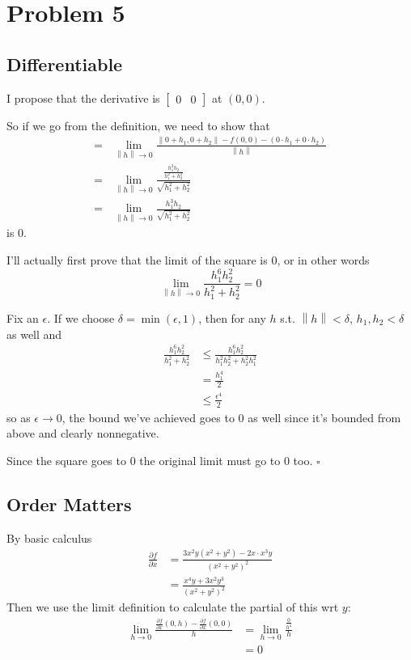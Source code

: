 \documentclass[12pt]{article}
\newcommand{\norm}[1]{\left\lVert#1\right\rVert}
\begin{document}
\pagebreak

\section{Problem 5}

\subsection{Differentiable}

I propose that the derivative is $\begin{bmatrix}0 & 0\end{bmatrix}$ at $(0, 0)$.

So if we go from the definition, we need to show that
\begin{align*}
  ={} & \lim_{\norm{h} \to 0} \frac{\norm{0 + h_1, 0 + h_2}-f(0, 0) - (0 \cdot h_1 + 0 \cdot h_2)}{\norm{h}} \\
  ={} & \lim_{\norm{h} \to 0} \frac{\frac{h_1^3h_2}{h_1^2+h_2^2}}{\sqrt{h_1^2+h_2^2}}                        \\
  ={} & \lim_{\norm{h} \to 0} \frac{h_1^3h_2}{\sqrt{h_1^2+h_2^2}}
\end{align*}
is $0$.

I'll actually first prove that the limit of the square is $0$, or in other words
\[\lim_{\norm{h} \to 0} \frac{h_1^6h_2^2}{h_1^2+h_2^2}=0\]

Fix an $\epsilon$.
If we choose $\delta=\min(\epsilon, 1)$, then for any $h$ s.t. $\norm{h} < \delta$,
$h_1, h_2 < \delta$ as well and
\begin{align*}
  \frac{h_1^6h_2^2}{h_1^2+h_2^2}
   & \le \frac{h_1^6h_2^2}{h_1^2h_2^2+h_2^2h_1^2} \\
   & = \frac{h_1^4}{2}                            \\
   & \le \frac{\epsilon^4}{2}
\end{align*}
so as $\epsilon \to 0$, the bound we've achieved goes to $0$ as well
since it's bounded from above and clearly nonnegative.

Since the square goes to $0$ the original limit must go to $0$ too. $\square$

\pagebreak

\subsection{Order Matters}

By basic calculus
\begin{align*}
  \frac{\partial f}{\partial x}
   & = \frac{3x^2y\left(x^2+y^2\right)-2x \cdot x^3y}{\left(x^2+y^2\right)^2} \\
   & = \frac{x^4y+3x^2y^3}{\left(x^2+y^2\right)^2}
\end{align*}
Then we use the limit definition to calculate the partial of this wrt $y$:
\begin{align*}
  \lim_{h \to 0} \frac{\frac{\partial f}{\partial x}(0, h)-\frac{\partial f}{\partial x}(0, 0)}{h}
   & = \lim_{h \to 0} \frac{\frac{0}{h^4}}{h} \\
   & = 0
\end{align*}
\end{document}

